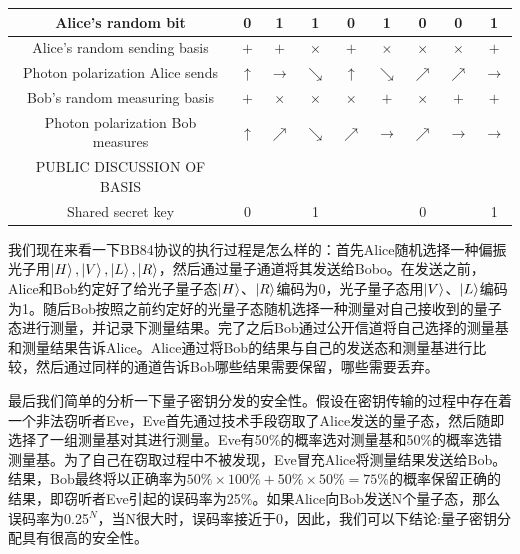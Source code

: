 \begin{table}[htbp]
	\centering
	\begin{tabular}{|c|c|c|c|c|c|c|c|c|}
		\hline  %
		Alice's random bit              &0&1&1&0&1&0&0&1\\
		\hline  %
		Alice's random sending basis    &$+$&$+$&$\times$&$+$&$\times$&$\times$&$\times$&$+$\\
		\hline  %
		Photon polarization Alice sends &$\uparrow$&$\rightarrow$&$\searrow$&$\uparrow$&$\searrow$&$\nearrow$&$\nearrow$&$\rightarrow$\\
		\hline  %
		Bob's random measuring basis    &$+$&$\times$&$\times$&$\times$&$+$&$\times$&$+$&$+$\\
		\hline  %
		Photon polarization Bob measures&$\uparrow$&$\nearrow$&$\searrow$&$\nearrow$&$\rightarrow$&$\nearrow$&$\rightarrow$&$\rightarrow$\\
		\hline  %
		PUBLIC DISCUSSION OF BASIS      &&&&&&&&\\
		\hline  %
		Shared secret key               &0&&1&&&0&&1\\
		\hline  %
	\end{tabular}
\end{table}
我们现在来看一下BB84协议的执行过程是怎么样的：首先Alice随机选择一种偏振光子用${\ket{H},\ket{V},\ket{L},\ket{R}}$，然后通过量子通道将其发送给Bobo。在发送之前，Alice和Bob约定好了给光子量子态$\ket{H}$、$\ket{R}$编码为0，光子量子态用$\ket{V}$、$\ket{L}$编码为1。随后Bob按照之前约定好的光量子态随机选择一种测量对自己接收到的量子态进行测量，并记录下测量结果。完了之后Bob通过公开信道将自己选择的测量基和测量结果告诉Alice。Alice通过将Bob的结果与自己的发送态和测量基进行比较，然后通过同样的通道告诉Bob哪些结果需要保留，哪些需要丢弃。

最后我们简单的分析一下量子密钥分发的安全性。假设在密钥传输的过程中存在着一个非法窃听者Eve，Eve首先通过技术手段窃取了Alice发送的量子态，然后随即选择了一组测量基对其进行测量。Eve有50\%的概率选对测量基和50\%的概率选错测量基。为了自己在窃取过程中不被发现，Eve冒充Alice将测量结果发送给Bob。结果，Bob最终将以正确率为$50\%\times 100\%+50\%\times 50\%=75\%$的概率保留正确的结果，即窃听者Eve引起的误码率为25\%。如果Alice向Bob发送N个量子态，那么误码率为0.25$^N$，当N很大时，误码率接近于0，因此，我们可以下结论:量子密钥分配具有很高的安全性。

